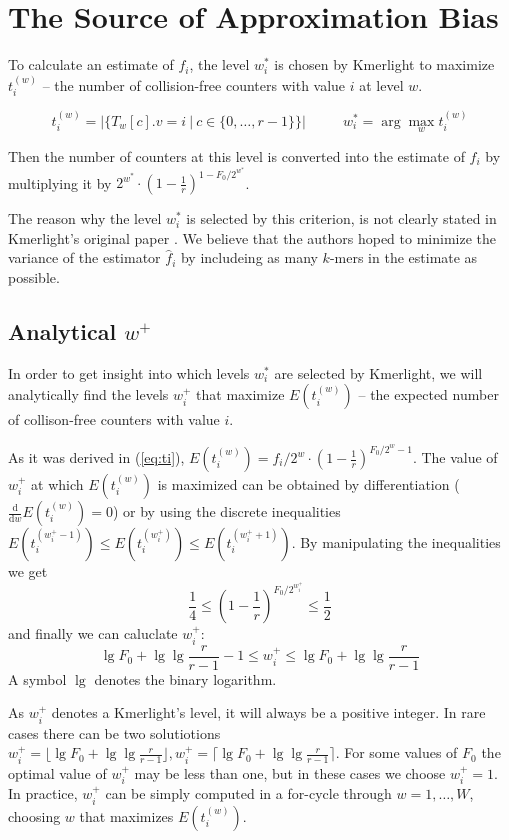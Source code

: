 \section{The Source of Approximation Bias}
\label{sec:source-of-bias}

To calculate an estimate of $f_i$, the level $w_i^*$ is chosen by Kmerlight
to maximize $t_i^{(w)}$ -- the number of collision-free counters with value $i$ at level $w$.

$$t_i^{(w)} = |\{T_w[c].v = i ~|~ c \in \{0, \dots, r-1\}\}| 
~~~~~~~~~~~~ w_i^* = \arg\max_w t_i^{(w)}$$

Then the number of counters at this level is converted into the estimate of
$f_i$ by multiplying it by $2^{w^*} \cdot \left(1 - \frac{1}{r}\right)^{1 - F_0/2^{w^*}}$. 

The reason why the level $w_i^*$ is selected by this criterion, 
is not clearly stated in Kmerlight's original paper \cite{Sivadasan2016}. 
We believe that the authors hoped to minimize the variance of the estimator $\hat f_i$
by includeing as many $k$-mers in the estimate as possible.

\subsection{Analytical $w^+$}
\label{sec:analytical-w}
In order to get insight into which levels $w_i^*$ are selected by Kmerlight, 
we will analytically find the levels $w_i^+$ that maximize $E(t_i^{(w)})$ -- the expected number 
of collison-free counters with value $i$.

As it was derived in (\ref{eq:ti}), 
$E(t_i^{(w)}) = f_i / 2^w \cdot \left(1 - \frac{1}{r}\right)^{F_0/2^w - 1}$.
The value of $w_i^+$ at which $E(t_i^{(w)})$ is maximized can be obtained by differentiation 
($\frac{\mathrm{d}}{\mathrm{d}w}E(t_i^{(w)}) = 0$) or by using the discrete inequalities 
$E(t_i^{(w^+_i-1)}) \leq E(t_i^{(w^+_i)}) \leq E(t_i^{(w^+_i+1)})$. 
By manipulating the inequalities we get
\begin{equation} \label{eq:wplusbounds}
\frac{1}{4} \leq \left(1 - \frac{1}{r}\right)^{F_0/2^{w^+_i}} \leq \frac{1}{2}
\end{equation}
and finally we can caluclate $w_i^+$:
$$\lg F_0 + \lg\lg \frac{r}{r-1}-1 \leq w_i^+ \leq \lg F_0 + \lg\lg \frac{r}{r-1}$$
A symbol $\lg$ denotes the binary logarithm. 

As $w_i^+$ denotes a Kmerlight's level, it will always be a positive integer.
In rare cases there can be two solutiotions $w_i^+ = \lfloor \lg F_0 + \lg\lg \frac{r}{r-1} \rfloor,
w_i^+ = \lceil \lg F_0 + \lg\lg \frac{r}{r-1} \rceil$. For some values of $F_0$ the optimal 
value of $w_i^+$ may be less than one, but in these cases we choose $w_i^+=1$. In practice,
$w^+_i$ can be simply computed in a for-cycle through $w=1, \dots, W$, choosing $w$ that
maximizes $E(t_i^{(w)})$. 

